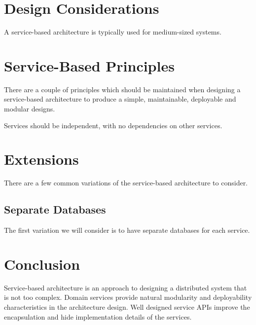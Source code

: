 \section{Design Considerations}\label{sec:design-considerations}

A service-based architecture is typically used for medium-sized systems.


\section{Service-Based Principles}

There are a couple of principles which should be maintained when designing a service-based architecture
to produce a simple, maintainable, deployable and modular designs.

\vspace{1mm}
\begin{definition}\label{independent-service}
    Services should be independent, with no dependencies on other services.
\end{definition}



\section{Extensions}

There are a few common variations of the service-based architecture to consider.

\subsection{Separate Databases}

The first variation  we will consider is to have separate databases for each service.


\section{Conclusion}

Service-based architecture is an approach to designing a distributed system that is not too complex.
Domain services provide natural modularity and deployability characteristics in the architecture design.
Well designed service APIs improve the encapsulation and hide implementation details of the services.
